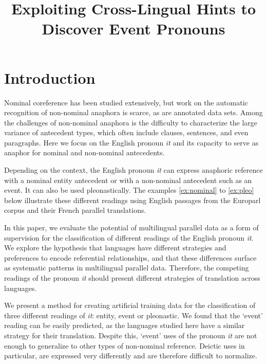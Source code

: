\documentclass[10pt, a4paper]{article} \usepackage{lrec} \usepackage{multibib}
\title{Exploiting Cross-Lingual Hints to Discover Event Pronouns}
\begin{document}
\maketitleabstract

\section{Introduction}

\renewcommand{\thefootnote}{\fnsymbol{footnote}}


Nominal coreference has been studied extensively, but work on the automatic 
recognition of non-nominal anaphora is scarce, as are annotated data sets. Among 
the challenges of non-nominal anaphora is the difficulty to characterize the 
large variance of antecedent types, which often include clauses, sentences, and 
even paragraphs. Here we focus on the English pronoun \textit{it} and its 
capacity to serve as anaphor for nominal and non-nominal antecedents. 

Depending on the context, the English pronoun \textit{it} can express anaphoric 
reference with a nominal entity antecedent or with a
non-nominal antecedent such as an event. It can also be used
pleonastically. The examples \ref{ex:nominal} to \ref{ex:pleo} below illustrate
these different readings using English passages from the Europarl corpus and
their French parallel translations. 

In this paper, we evaluate the potential of multilingual parallel data as a 
form of supervision for the classification of different readings of the English 
pronoun \textit{it}. We explore the hypothesis that languages have different strategies 
and preferences to encode referential relationships, and that these differences 
surface as systematic patterns in multilingual parallel data. Therefore, the 
competing readings of the pronoun \textit{it} should present different strategies of 
translation across languages.  

We present a method for creating artificial training data for the classification 
of three different readings of \textit{it}: entity, event or pleonastic. 
We found that the `event' reading can be easily
predicted, as the languages studied here have a similar strategy for their translation. 
Despite this, `event' uses of the pronoun \textit{it} are not enough to generalize to
other types of non-nominal reference. Deictic uses in particular, are expressed
very differently and are therefore difficult to normalize.
\end{document}
